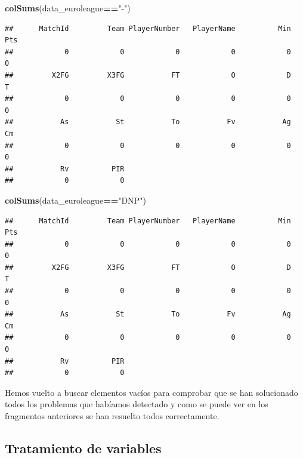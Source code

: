 \documentclass[
]{article}
\newenvironment{Shaded}{\begin{snugshade}}{\end{snugshade}}
\newcommand{\KeywordTok}[1]{\textcolor[rgb]{0.13,0.29,0.53}{\textbf{#1}}}
\newcommand{\NormalTok}[1]{#1}
\newcommand{\OperatorTok}[1]{\textcolor[rgb]{0.81,0.36,0.00}{\textbf{#1}}}
\newcommand{\StringTok}[1]{\textcolor[rgb]{0.31,0.60,0.02}{#1}}
\begin{document}
\begin{Shaded}
\begin{Highlighting}[]
\KeywordTok{colSums}\NormalTok{(data_euroleague}\OperatorTok{==}\StringTok{"-"}\NormalTok{)}
\end{Highlighting}
\end{Shaded}

\begin{verbatim}
##      MatchId         Team PlayerNumber   PlayerName          Min          Pts 
##            0            0            0            0            0            0 
##         X2FG         X3FG           FT            O            D            T 
##            0            0            0            0            0            0 
##           As           St           To           Fv           Ag           Cm 
##            0            0            0            0            0            0 
##           Rv          PIR 
##            0            0
\end{verbatim}

\begin{Shaded}
\begin{Highlighting}[]
\KeywordTok{colSums}\NormalTok{(data_euroleague}\OperatorTok{==}\StringTok{"DNP"}\NormalTok{)}
\end{Highlighting}
\end{Shaded}

\begin{verbatim}
##      MatchId         Team PlayerNumber   PlayerName          Min          Pts 
##            0            0            0            0            0            0 
##         X2FG         X3FG           FT            O            D            T 
##            0            0            0            0            0            0 
##           As           St           To           Fv           Ag           Cm 
##            0            0            0            0            0            0 
##           Rv          PIR 
##            0            0
\end{verbatim}

Hemos vuelto a buscar elementos vacíos para comprobar que se han
solucionado todos los problemas que habíamos detectado y como se puede
ver en los fragmentos anteriores se han resuelto todos correctamente.

\newpage

\hypertarget{tratamiento-de-variables}{%
\subsection{Tratamiento de variables}\label{tratamiento-de-variables}}
\end{document}
